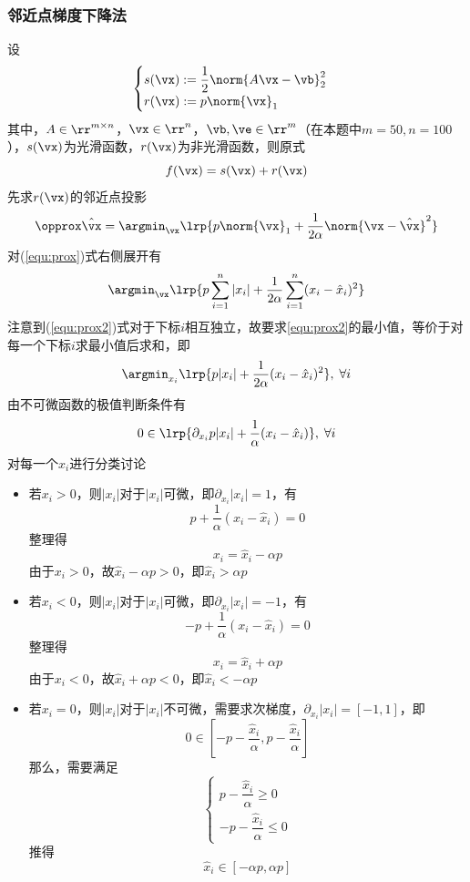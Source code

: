 \documentclass[logo,reportComp]{thesis}
\begin{document}
\subsubsection{邻近点梯度下降法}
设
\[\begin{cases}
s(\vx):=\dfrac{1}{2}\norm{A\vx-\vb}_2^2\\
r(\vx):=p\norm{\vx}_1
\end{cases}\]
其中，$A\in\rr^{m\times n}$，$\vx\in\rr^n$，$\vb,\ve\in\rr^m$（在本题中$m=50,n=100$），$s(\vx)$为光滑函数，$r(\vx)$为非光滑函数，则原式
\[f(\vx)=s(\vx)+r(\vx)\]
先求$r(\vx)$的邻近点投影
\begin{equation}
\label{equ:prox}
\opprox \hat{\vx}=\argmin_\vx\lrp{p\norm{\vx}_1+\frac{1}{2\alpha}\norm{\vx-\hat{\vx}}^2}
\end{equation}
对(\ref{equ:prox})式右侧展开有
\begin{equation}
\label{equ:prox2}
\argmin_\vx\lrp{p\sum_{i=1}^n|x_i|+\frac{1}{2\alpha}\sum_{i=1}^n(x_i-\hat{x}_i)^2}
\end{equation}
注意到(\ref{equ:prox2})式对于下标$i$相互独立，故要求\ref{equ:prox2}的最小值，等价于对每一个下标$i$求最小值后求和，即
\begin{equation}
\label{equ:prox3}
\argmin_{x_i}\lrp{p|x_i|+\frac{1}{2\alpha}(x_i-\hat{x}_i)^2},\;\forall i
\end{equation}
由不可微函数的极值判断条件有
\begin{equation}
0\in\lrp{\partial_{x_i}p|x_i|+\frac{1}{\alpha}(x_i-\hat{x}_i)},\;\forall i
\end{equation}
对每一个$x_i$进行分类讨论
\begin{itemize}
	\item 若$x_i>0$，则$|x_i|$对于$|x_i|$可微，即$\partial_{x_i}|x_i|=1$，有
	\[p+\frac{1}{\alpha}(x_i-\hat{x}_i)=0\]
	整理得
	\[x_i=\hat{x}_i-\alpha p\]
	由于$x_i>0$，故$\hat{x}_i-\alpha p>0$，即$\hat{x}_i>\alpha p$
	\item 若$x_i<0$，则$|x_i|$对于$|x_i|$可微，即$\partial_{x_i}|x_i|=-1$，有
	\[-p+\frac{1}{\alpha}(x_i-\hat{x}_i)=0\]
	整理得
	\[x_i=\hat{x}_i+\alpha p\]
	由于$x_i<0$，故$\hat{x}_i+\alpha p<0$，即$\hat{x}_i<-\alpha p$
	\item 若$x_i=0$，则$|x_i|$对于$|x_i|$不可微，需要求次梯度，$\partial_{x_i}|x_i|=[-1,1]$，即
	\[0\in\left[-p-\frac{\hat{x}_i}{\alpha},p-\frac{\hat{x}_i}{\alpha}\right]\]
	那么，需要满足
	\[\begin{cases}
	p-\dfrac{\hat{x}_i}{\alpha}\geq 0\\
	-p-\dfrac{\hat{x}_i}{\alpha}\leq 0
	\end{cases}\]
	推得
	\[\hat{x}_i\in[-\alpha p,\alpha p]\]
\end{itemize}
\end{document}
